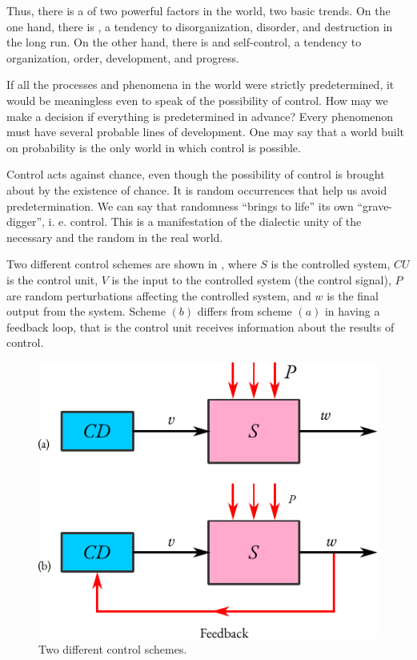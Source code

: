 Thus, there is a  of two powerful factors in the world,
two basic trends. On the one hand, there is , a tendency to
disorganization, disorder, and destruction in the long run. On the other
hand, there is  and self-control, a tendency to organization, order, development, and progress.

 If all the processes and
phenomena in the world were strictly predetermined, it would be
meaningless even to speak of the possibility of control.  How may we make
a decision if everything is predetermined in advance? Every
phenomenon must have several probable lines of development. One may
say that a world built on probability is the only world in which control
is possible.

Control acts against chance, even though the possibility of control is
brought about by the existence of chance. It is random occurrences that
help us avoid predetermination. We can say that randomness ``brings to
life'' its own ``grave-digger'', i. e. control. This is a manifestation of the
dialectic unity of the necessary and the random in the real world.

 Two different control schemes are shown in
 , where $S$ is the controlled system, $CU$ is the control unit, $V$ is the input to the controlled system (the control signal), $P$ are random perturbations affecting the controlled system, and $w$ is the final output
from the system. Scheme $(b)$ differs from scheme $(a)$ in having a feedback
loop, that is the control unit receives information about the results of
control.
\begin{figure}[!ht]
 \centering
 \includegraphics[width=0.75\tfwidth]{figures/control-scheme-1.pdf}
\caption{Two different control schemes.\label{control-scheme-1}}
 \end{figure}

